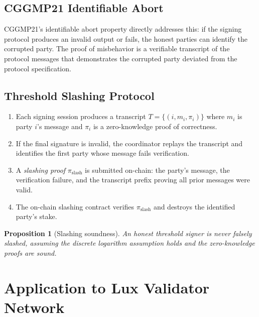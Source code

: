 \documentclass[11pt,a4paper]{article}
\newtheorem{proposition}[theorem]{Proposition}
\begin{document}
\subsection{CGGMP21 Identifiable Abort}

CGGMP21's identifiable abort property directly addresses this: if the signing protocol
produces an invalid output or fails, the honest parties can identify the corrupted
party. The proof of misbehavior is a verifiable transcript of the protocol messages
that demonstrates the corrupted party deviated from the protocol specification.

\subsection{Threshold Slashing Protocol}

\begin{enumerate}[leftmargin=2em]
  \item Each signing session produces a transcript $T = \{(i, m_i, \pi_i)\}$ where
        $m_i$ is party $i$'s message and $\pi_i$ is a zero-knowledge proof of
        correctness.
  \item If the final signature is invalid, the coordinator replays the transcript
        and identifies the first party whose message fails verification.
  \item A \emph{slashing proof} $\pi_{\text{slash}}$ is submitted on-chain:
        the party's message, the verification failure, and the transcript prefix
        proving all prior messages were valid.
  \item The on-chain slashing contract verifies $\pi_{\text{slash}}$ and destroys
        the identified party's stake.
\end{enumerate}

\begin{proposition}[Slashing soundness]
An honest threshold signer is never falsely slashed, assuming the discrete logarithm
assumption holds and the zero-knowledge proofs are sound.
\end{proposition}

\section{Application to Lux Validator Network}
\label{sec:application}
\end{document}

